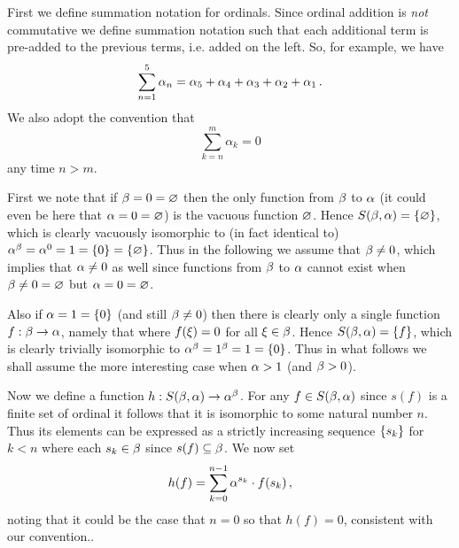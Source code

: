 \def\ex{6.5.16}
\setcounter{itm}{0}
\question{\ex}

\begin{solution}
    First we define summation notation for ordinals.
    Since ordinal addition is \emph{not} commutative we define summation notation such that each additional term is pre-added to the previous terms, i.e. added on the left.
    So, for example, we have
    $$
    \sum_{n = 1}^5 \alpha_n = \alpha_5 + \alpha_4 + \alpha_3 + \alpha_2 + \alpha_1 \,.
    $$
    We also adopt the convention that
    $$
    \sum_{k=n}^m \alpha_k = 0
    $$
    any time $n > m$.

    First we note that if $\beta = 0 = \varnothing$ then the only function from $\beta$ to $\alpha$ (it  could even be here that $\alpha = 0 = \varnothing$) is the vacuous function $\varnothing$.
    Hence $S(\beta, \alpha) = \left\{ \varnothing \right\}$, which is clearly vacuously isomorphic to (in fact identical to) $\alpha^\beta = \alpha^0 = 1 = \left\{ 0 \right\} = \left\{ \varnothing \right\}$.
    Thus in the following we assume that $\beta \neq 0$, which implies that $\alpha \neq 0$ as well since functions from $\beta$ to $\alpha$ cannot exist when $\beta \neq 0 = \varnothing$ but $\alpha = 0 = \varnothing$.

    Also if $\alpha = 1 = \left\{ 0 \right\}$ (and still $\beta \neq 0$) then there is clearly only a single function $f: \beta \to \alpha$, namely that where $f(\xi) = 0$ for all $\xi \in \beta$.
    Hence $S(\beta, \alpha) = \left\{ f \right\}$, which is clearly trivially isomorphic to $\alpha^\beta = 1^\beta = 1 = \left\{ 0 \right\}$.
    Thus in what follows we shall assume the more interesting case when $\alpha > 1$ (and $\beta > 0$).

    Now we define a function $h : S(\beta, \alpha) \to \alpha^\beta$.
    For any $f \in S(\beta, \alpha)$ since $s(f)$ is a finite set of ordinal it follows that it is isomorphic to some natural number $n$.
    Thus its elements can be expressed as a  strictly increasing sequence $\left\{ s_k \right\}$ for $k < n$ where each $s_k \in \beta$ since $s(f) \subseteq \beta$.
    We now set
    $$
    h(f) = \sum_{k=0}^{n-1} \alpha^{s_k} \cdot f(s_k) \,,
    $$
    noting that it could be the case that $n=0$ so that $h(f) = 0$, consistent with our convention..


\end{solution}
